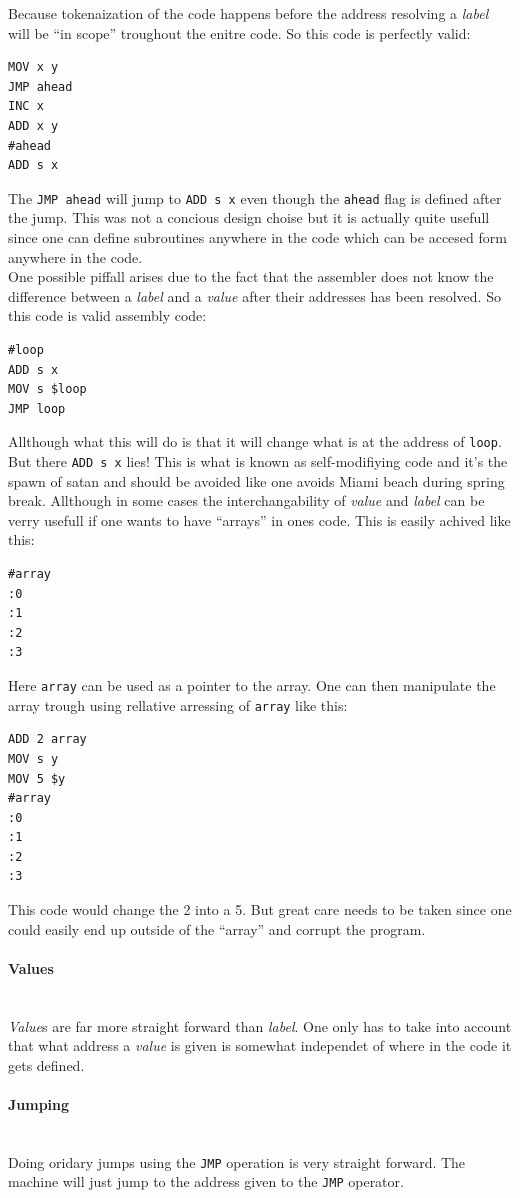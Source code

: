 \documentclass{article}
\newcommand{\V}{\verb}
\begin{document}
Because tokenaization of the code happens before the address resolving a \emph{label}
will be ``in scope'' troughout the enitre code. So this code is perfectly valid:

\begin{verbatim}
MOV x y
JMP ahead
INC x
ADD x y
#ahead
ADD s x
\end{verbatim}
The \V+JMP ahead+ will jump to \V+ADD s x+ even though the \V+ahead+ flag is
defined after the jump. This was not a concious design choise but it is actually
quite usefull since one can define subroutines anywhere in the code which can be
accesed form anywhere in the code.\\
One possible piffall arises due to the fact that the assembler does not know the
difference between a \emph{label} and a \emph{value} after their addresses has been resolved.
So this code is valid assembly code:
\begin{verbatim}
#loop
ADD s x
MOV s $loop
JMP loop
\end{verbatim}
Allthough what this will do is that it will change what is at the address of
\V+loop+. But there \V+ADD s x+ lies! This is what is known as self-modifiying
code and it's the spawn of satan and should be avoided like one avoids Miami
beach during spring break. Allthough in some cases the interchangability of
\emph{value} and \emph{label} can be verry usefull if one wants to have ``arrays'' in ones
code. This is easily achived like this:
\begin{verbatim}
#array
:0
:1
:2
:3
\end{verbatim}
Here \V+array+ can be used as a pointer to the array. One can then manipulate
the array trough using rellative arressing of \V+array+ like this:
\begin{verbatim}
ADD 2 array
MOV s y
MOV 5 $y
#array
:0
:1
:2
:3
\end{verbatim}
This code would change the 2 into a 5. But great care needs to be taken since
one could easily end up outside of the ``array'' and corrupt the program.

\paragraph{Values} \
\\
\emph{Value}s are far more straight forward than \emph{label}. One only has to
take into account that what address a \emph{value} is given is somewhat
independet of where in the code it gets defined.

\paragraph{Jumping} \
\\
Doing oridary jumps using the \V+JMP+ operation is very straight forward. The
machine will just jump to the address given to the \V+JMP+ operator.
\end{document}
